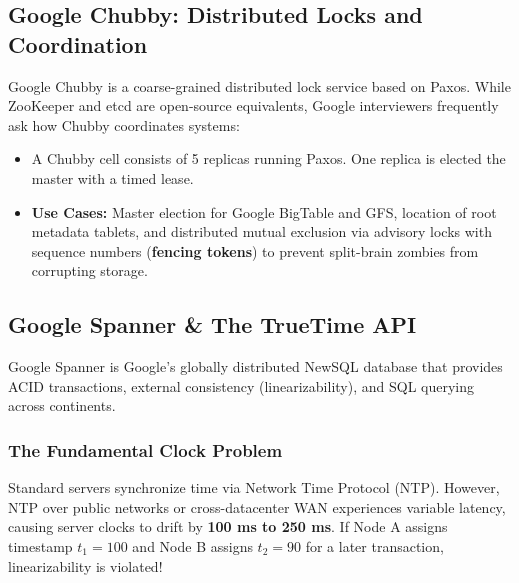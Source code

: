 \documentclass[10pt,journal,compsoc,onecolumn]{IEEEtran}
\begin{document}
\subsection{Google Chubby: Distributed Locks and Coordination}
Google Chubby is a coarse-grained distributed lock service based on Paxos. While ZooKeeper and etcd are open-source equivalents, Google interviewers frequently ask how Chubby coordinates systems:
\begin{itemize}
    \item A Chubby cell consists of 5 replicas running Paxos. One replica is elected the master with a timed lease.
    \item \textbf{Use Cases:} Master election for Google BigTable and GFS, location of root metadata tablets, and distributed mutual exclusion via advisory locks with sequence numbers (\textbf{fencing tokens}) to prevent split-brain zombies from corrupting storage.
\end{itemize}

\subsection{Google Spanner \& The TrueTime API}
Google Spanner is Google's globally distributed NewSQL database that provides ACID transactions, external consistency (linearizability), and SQL querying across continents.

\subsubsection{The Fundamental Clock Problem}
Standard servers synchronize time via Network Time Protocol (NTP). However, NTP over public networks or cross-datacenter WAN experiences variable latency, causing server clocks to drift by \textbf{100 ms to 250 ms}. If Node A assigns timestamp $t_1 = 100$ and Node B assigns $t_2 = 90$ for a later transaction, linearizability is violated!
\end{document}
